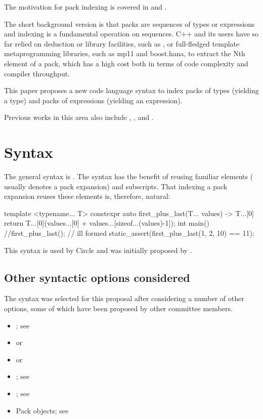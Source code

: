 \documentclass{wg21}
\begin{document}
The motivation for pack indexing is covered in  and
 .

The short background version is that packs are sequences of types or expressions
and indexing is a fundamental operation on sequences.
C++ and its users have so far relied on deduction or library facilities, such as , or full-fledged template metaprogramming libraries, such as
mp11 and boost.hana, to extract the Nth element of a pack, which has a high cost both in terms of code complexity and compiler throughput.

This paper proposes a new code language syntax to index packs of types (yielding a type) and packs of expressions (yielding an expression).

Previous works in this area also include , ,  and .

\section{Syntax}

The general syntax is .
The syntax has the benefit of reusing familiar elements ( usually denotes a pack expansion) and \tcode{[]} subscripts.
That indexing a pack expansion reuses these elements is, therefore, natural:

\begin{colorblock}
template <typename... T>
constexpr auto first_plus_last(T... values) ->  T...[0] {
    return T...[0](values...[0] + values...[sizeof...(values)-1]);
}
int main() {
    //first_plus_last(); // ill formed
    static_assert(first_plus_last(1, 2, 10) == 11);
}
\end{colorblock}

This syntax is used by Circle and was initially proposed by .

\subsection{Other syntactic options considered}

The 
syntax was selected for this proposal after considering a
number of other options, some of which have been proposed by other
committee members.
\begin{itemize}
\item {}; see 
\item {} or 
\item {} or 
\item {}; see 
\item {}; see 
\item Pack objects; see 
\end{itemize}
\end{document}
